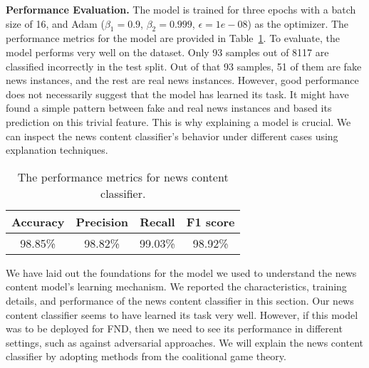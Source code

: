\textbf{Performance Evaluation.} The model is trained for three epochs with a batch size of 16, and Adam ($\beta_1=0.9$, $\beta_2=0.999$, $\epsilon=1e-08$) as the optimizer. The performance metrics for the model are provided in Table~\ref{tab:newsContentModelPerformanceMetrics}. To evaluate, the model performs very well on the dataset. Only 93 samples out of 8117 are classified incorrectly in the test split. Out of that 93 samples, 51 of them are fake news instances, and the rest are real news instances. However, good performance does not necessarily suggest that the model has learned its task. It might have found a simple pattern between fake and real news instances and based its prediction on this trivial feature. This is why explaining a model is crucial. We can inspect the news content classifier's behavior under different cases using explanation techniques.\\
\begin{table}
    \centering
    \begin{tabular}{c | c | c | c}
        \textbf{Accuracy} & \textbf{Precision} & \textbf{Recall} & \textbf{F1 score} \\
        \hline
        98.85\%           & 98.82\%            & 99.03\%         & 98.92\%           \\
    \end{tabular}
    \caption[The performance metrics for news content classifier.]{The performance metrics for news content classifier.}
    \label{tab:newsContentModelPerformanceMetrics}
\end{table}
We have laid out the foundations for the model we used to understand the news content model's learning mechanism. We reported the characteristics, training details, and performance of the news content classifier in this section. Our news content classifier seems to have learned its task very well. However, if this model was to be deployed for FND, then we need to see its performance in different settings, such as against adversarial approaches. We will explain the news content classifier by adopting methods from the coalitional game theory.

